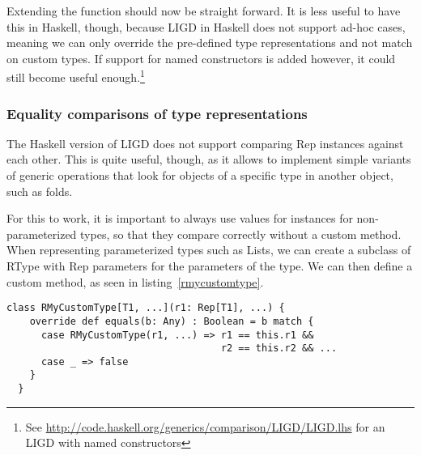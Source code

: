 Extending the function should now be straight forward. It is less useful to
have this in Haskell, though, because LIGD in Haskell does not support ad-hoc
cases, meaning we can only override the pre-defined type representations and not
match on custom types. If support for named constructors is added however, it
could still become useful enough.\footnote{See \url{http://code.haskell.org/generics/comparison/LIGD/LIGD.lhs} for an LIGD with named constructors}

\subsubsection{Equality comparisons of type representations}
The Haskell version of LIGD does not support comparing Rep instances
against each other. This is quite useful, though, as it allows to
implement simple variants of generic operations that look for objects
of a specific type in another object, such as folds.

For this to work, it is important to always use values for  instances
for non-parameterized types, so that they compare correctly without a custom
 method.
When representing parameterized types such as Lists, we can create a subclass
of RType with Rep parameters for the parameters of the type. We can then
define a custom  method, as seen in listing~\ref{rmycustomtype}.

\begin{lstlisting}[float,caption=Pattern for representing parameterized types,label=rmycustomtype]
  class RMyCustomType[T1, ...](r1: Rep[T1], ...) {
    override def equals(b: Any) : Boolean = b match {
      case RMyCustomType(r1, ...) => r1 == this.r1 &&
                                     r2 == this.r2 && ...
      case _ => false
    }
  }
\end{lstlisting}
